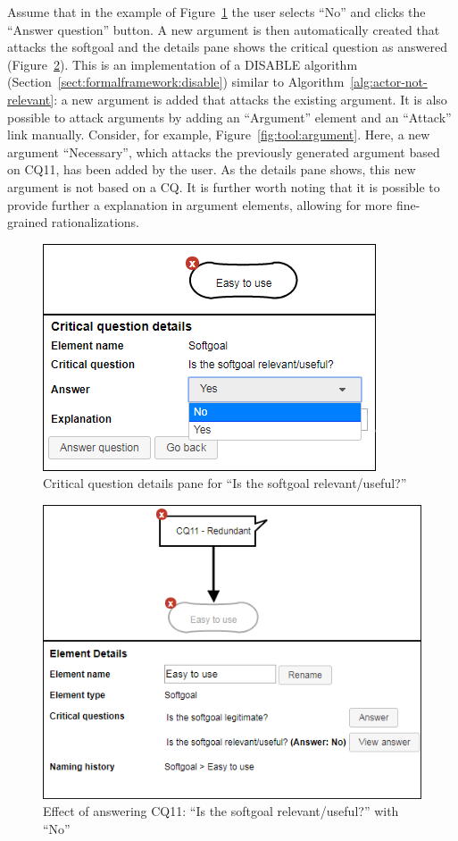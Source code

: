 Assume that in the example of Figure~\ref{fig:tool:cqdetails} the user selects ``No'' and clicks the ``Answer question'' button. A new argument is then automatically created that attacks the softgoal and the details pane shows the critical question as answered (Figure~\ref{fig:tool:cqeffect}). This is an implementation of a \textsf{DISABLE} algorithm (Section~\ref{sect:formalframework:disable}) similar to Algorithm~\ref{alg:actor-not-relevant}: a new argument is added that attacks the existing argument. It is also possible to attack arguments by adding an ``Argument'' element and an ``Attack'' link manually. Consider, for example, Figure~\ref{fig:tool:argument}. Here, a new argument ``Necessary'', which attacks the previously generated argument based on CQ11, has been added by the user. As the details pane shows, this new argument is not based on a CQ. It is further worth noting that it is possible to provide further a explanation in argument elements, allowing for more fine-grained rationalizations. 

\begin{figure}[t]
\centering
\includegraphics[width=0.8\columnwidth]{img/tool/details_softgoal}
\caption{Critical question details pane for ``Is the softgoal relevant/useful?''}
\label{fig:tool:cqdetails}
\end{figure}

\begin{figure}[b]
\centering
\includegraphics[width=\columnwidth]{img/tool/attack_softgoal}
\caption{Effect of answering CQ11: ``Is the softgoal relevant/useful?'' with ``No''}
\label{fig:tool:cqeffect}
\end{figure}

